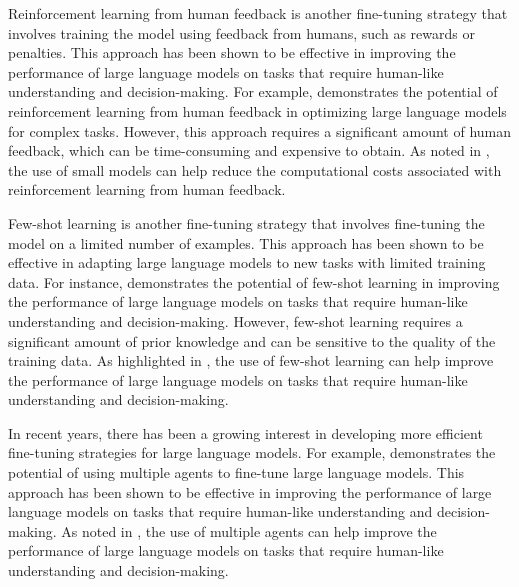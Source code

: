 \documentclass[11pt,a4paper]{article}
\begin{document}
Reinforcement learning from human feedback is another fine-tuning strategy that involves training the model using feedback from humans, such as rewards or penalties. This approach has been shown to be effective in improving the performance of large language models on tasks that require human-like understanding and decision-making. For example, \cite{arxiv:2402.10172} demonstrates the potential of reinforcement learning from human feedback in optimizing large language models for complex tasks. However, this approach requires a significant amount of human feedback, which can be time-consuming and expensive to obtain. As noted in \cite{arxiv:2409.06857}, the use of small models can help reduce the computational costs associated with reinforcement learning from human feedback.

Few-shot learning is another fine-tuning strategy that involves fine-tuning the model on a limited number of examples. This approach has been shown to be effective in adapting large language models to new tasks with limited training data. For instance, \cite{arxiv:2206.07682} demonstrates the potential of few-shot learning in improving the performance of large language models on tasks that require human-like understanding and decision-making. However, few-shot learning requires a significant amount of prior knowledge and can be sensitive to the quality of the training data. As highlighted in \cite{doi:10.3390/app14052074}, the use of few-shot learning can help improve the performance of large language models on tasks that require human-like understanding and decision-making.

In recent years, there has been a growing interest in developing more efficient fine-tuning strategies for large language models. For example, \cite{arxiv:2402.05120} demonstrates the potential of using multiple agents to fine-tune large language models. This approach has been shown to be effective in improving the performance of large language models on tasks that require human-like understanding and decision-making. As noted in \cite{arxiv:2406.04692}, the use of multiple agents can help improve the performance of large language models on tasks that require human-like understanding and decision-making.
\end{document}
